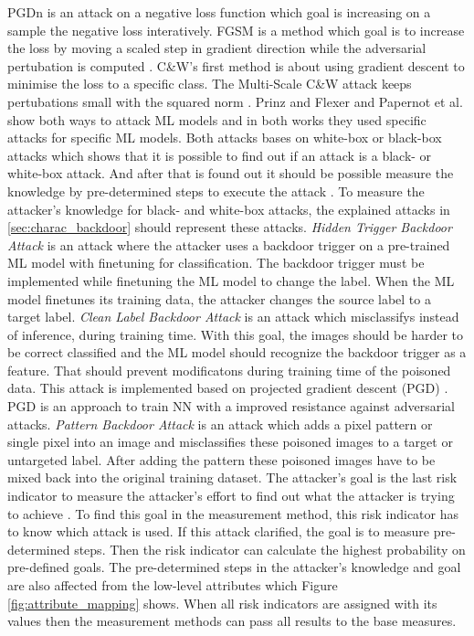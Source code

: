 PGDn is an attack on a negative loss function \cite{DBLP:journals/corr/MadryMSTV17} which goal is increasing on a sample the negative loss interatively. FGSM is a method which goal is to increase the loss by moving a scaled step in gradient direction while the adversarial pertubation is computed \cite{DBLP:journals/corr/GoodfellowSS14}. C\&W's first method is about using gradient descent to minimise the loss to a specific class. The Multi-Scale C\&W attack keeps pertubations small with the squared norm \cite{DBLP:conf/sp/Carlini018}.
Prinz and Flexer \cite{DBLP:journals/corr/abs-2007-14714} and Papernot et al. \cite{DBLP:conf/ccs/PapernotMGJCS17} show both ways to attack ML models and in both works they used specific attacks for specific ML models. Both attacks bases on white-box or black-box attacks which shows that it is possible to find out if an attack is a black- or white-box attack. And after that is found out it should be possible measure the knowledge by pre-determined steps to execute the attack \cite{bsi_2013}. To measure the attacker's knowledge for black- and white-box attacks, the explained attacks in \ref{sec:charac_backdoor} should represent these attacks. \textit{Hidden Trigger Backdoor Attack} \cite{DBLP:journals/corr/abs-1910-00033} is an attack where the attacker uses a backdoor trigger on a pre-trained ML model with finetuning for classification. The backdoor trigger must be implemented while finetuning the ML model to change the label. When the ML model finetunes its training data, the attacker changes the source label to a target label. \textit{Clean Label Backdoor Attack} \cite{turner2018clean} is an attack which misclassifys instead of inference, during training time. With this goal, the images should be harder to be correct classified and the ML model should recognize the backdoor trigger as a feature. That should prevent modificatons during training time of the poisoned data. This attack is implemented based on projected gradient descent (PGD) \cite{DBLP:journals/corr/MadryMSTV17}. PGD is an approach to train NN with a improved resistance against adversarial attacks.
\textit{Pattern Backdoor Attack} \cite{DBLP:journals/corr/abs-1708-06733} is an attack which adds a pixel pattern or single pixel into an image and misclassifies these poisoned images to a target or untargeted label. After adding the pattern these poisoned images have to be mixed back into the original training dataset. The attacker's goal is the last risk indicator to measure the attacker's effort to find out what the attacker is trying to achieve \cite{DBLP:journals/corr/abs-2012-04884}. To find this goal in the measurement method, this risk indicator has to know which attack is used. If this attack clarified, the goal is to measure pre-determined steps. Then the risk indicator can calculate the highest probability on pre-defined goals. The pre-determined steps in the attacker's knowledge and goal are also affected from the low-level attributes which Figure \ref{fig:attribute_mapping} shows. When all risk indicators are assigned with its values then the measurement methods can pass all results to the base measures.

